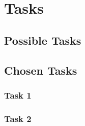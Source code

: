 \section{Tasks}\label{sec:tasks}


\subsection{Possible Tasks}


\subsection{Chosen Tasks}



\subsubsection{Task 1}\label{sec:task1}


\subsubsection{Task 2}\label{sec:task2}

